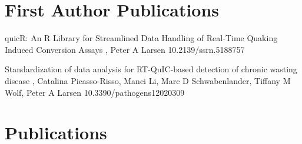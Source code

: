\documentclass{resume}
\begin{document}
    \section{First Author Publications}
        \begin{samepage}
            {quicR: An R Library for Streamlined Data Handling of Real-Time Quaking Induced Conversion Assays}
            {\me{}, Peter A Larsen}
            {10.2139/ssrn.5188757}

            {Standardization of data analysis for RT-QuIC-based detection of chronic wasting disease}
            {\me{}, Catalina Picasso-Risso, Manci Li, Marc D Schwabenlander, Tiffany M Wolf, Peter A Larsen}
            {10.3390/pathogens12020309}
        \end{samepage}


    \section{Publications}
\end{document}
